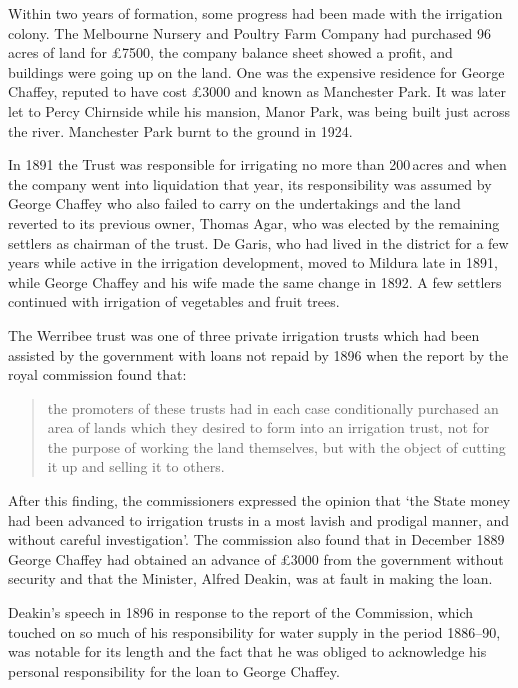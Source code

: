 Within two years of formation, some progress had been made with the
irrigation colony.  The Melbourne Nursery and Poultry Farm Company
 had
purchased 96\,acres of land for \pounds7500, the company balance sheet
showed a profit, and buildings were going up on the land.  One was the
expensive residence for George Chaffey, reputed to have cost
\pounds3000 and known as Manchester Park.  It was later let to 
Percy Chirnside while his mansion, Manor Park, was being built just
across the river.  Manchester Park burnt to the ground in
1924.

In 1891 the Trust was responsible for irrigating no more than
200\,acres and when the company went into liquidation that year, its
responsibility was assumed by George Chaffey who also failed to carry
on the undertakings and the land reverted to its previous owner,
Thomas Agar,  who was elected by the remaining
settlers as chairman of the trust.  De Garis, who had lived in the
district for a few years while active in the irrigation development,
moved to Mildura late in 1891, while George Chaffey and his wife made
the same change in 1892.  A few settlers continued with irrigation of
vegetables and fruit trees.

The Werribee trust was one of three private irrigation trusts which
had been assisted by the government with loans not repaid by 1896 when
the report by the royal commission found that:
\begin{quote}
	the promoters of these trusts had in each case conditionally
	purchased an area of lands which they desired to form into an
	irrigation trust, not for the purpose of working the land
	themselves, but with the object of cutting it up and selling
	it to others.
\end{quote}
After this finding, the commissioners expressed the opinion that `the
State money had been advanced to irrigation trusts in a most lavish
and prodigal manner, and without careful investigation'. The
commission also found that in December 1889 George Chaffey had
obtained an advance of \pounds3000 from the government without
security and that the Minister, Alfred Deakin, was at fault in making
the loan.

Deakin's speech in 1896 in response to the report of the Commission,
which touched on so much of his responsibility for water supply in the
period 1886--90, was notable for its length and the fact that he was
obliged to acknowledge his personal responsibility for the loan to
George Chaffey.

